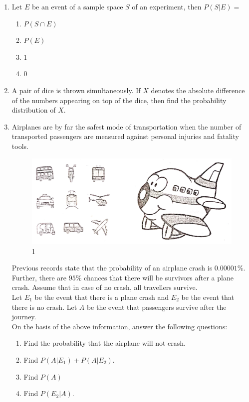 \begin{enumerate}
	\item Let $E$ be an event of a sample space $S$ of an experiment, then $P(S|E)=$
		\begin{enumerate}
			\item $P(S \cap E)$
			\item $P(E)$
			\item $1$
			\item $0$
		\end{enumerate}
	\item A pair of dice is thrown simultaneously. If $X$ denotes the absolute difference of the numbers appearing on top of the dice, then find the probability distribution of $X$.
	\item Airplanes are by far the safest mode of transportation when the number of transported passengers are measured against personal injuries and fatality tools.
		\begin{figure}[h]
			\centering
			     \includegraphics[width=\columnwidth]{figs/Air.jpg}
			     \caption{1}
			\label{Figure}
		\end{figure}
	      Previous records state that the probability of an airplane crash is $0.00001\%$. Further, there are $95\%$ chances that there will be survivors after a plane crash. Assume that in case of no crash, all travellers survive.\\
		Let $E_{1}$ be the event that there is a plane crash and $E_{2}$ be the event that there is no crash. Let $A$ be the event that passengers survive after the journey.\\
	      On the basis of the above information, answer the following questions:
		\begin{enumerate}[label=(\roman*)]
			\item Find the probability that the airplane will not crash.
			\item Find $P(A|E_{1}) + P(A|E_{2})$.
			\item Find $P(A)$
			\item Find $P(E_{2} | A)$.
		\end{enumerate}
\end{enumerate}
